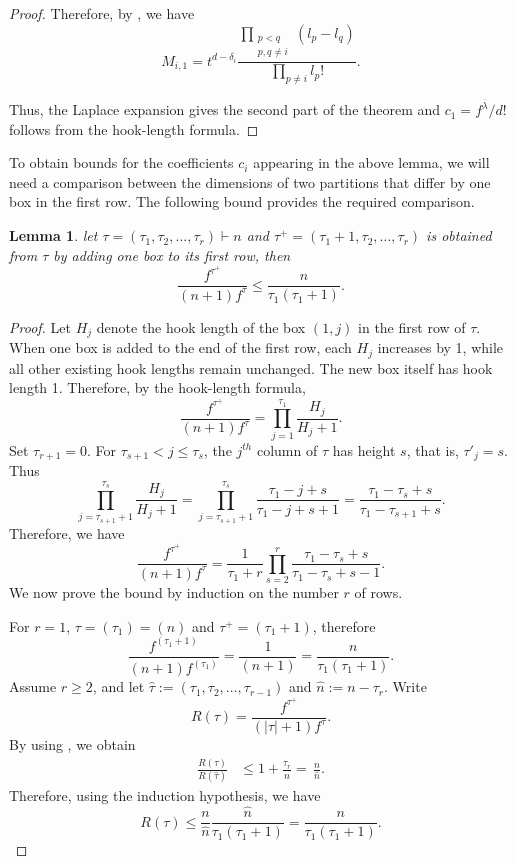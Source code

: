 \documentclass[12pt]{article}
\newtheorem{lemma}{Lemma}[section]
\theoremstyle{definition}
\newcommand{\1}{\mathbf 1}
\begin{document}
\begin{proof}
Therefore, by , we have 
$$M_{i,1}=t^{d-\delta_i}\frac{\prod_{\substack{p<q\\p,q\neq i}}(l_p-l_q)}{\prod_{p\neq i}l_p!}.$$

Thus, the Laplace expansion gives the second part of the theorem and $c_1=f^{\overline{\lambda}}/d!$ follows from the hook-length formula.
\end{proof}

To obtain bounds for the coefficients $c_i$ appearing in the above lemma, we will need a comparison between the dimensions of two partitions that differ by one box in the first row. The following bound provides the required comparison.

\begin{lemma}\label{lem:fTtau_bound_adding_one_box}
    let $\tau=(\tau_1,\tau_2,\ldots, \tau_r)\vdash n$ and $\tau^+=(\tau_1+1,\tau_2,\ldots, \tau_r)$ is obtained from $\tau$ by adding one box to its first row, then 
    $$\frac{f^{\tau^+}}{(n+1)f^{\tau}}\leq \frac{n}{\tau_1(\tau_1+1)}.$$
\end{lemma}
\begin{proof}
    Let $H_j$ denote the hook length of the box $(1,j)$ in the first row of $\tau$. When one box is added to the end of the first row, each $H_j$ increases by 1, while all other existing hook lengths remain unchanged. The new box itself has hook length 1. Therefore, by the hook-length formula,
    $$\frac{f^{\tau^+}}{(n+1)f^{\tau}} =  \prod_{j=1}^{\tau_1}\frac{H_j}{H_j+1}.$$
Set $\tau_{r+1}=0$. For $\tau_{s+1}<j\leq \tau_s$, the $j^{th}$ column of $\tau$ has height $s$, that is, $\tau'_j=s$. Thus
$$\prod_{j=\tau_{s+1}+1}^{\tau_s}\frac{H_j}{H_j+1}=\prod_{j=\tau_{s+1}+1}^{\tau_s}\frac{\tau_1-j+s}{\tau_1-j+s+1}=\frac{\tau_1-\tau_s+s}{\tau_1-\tau_{s+1}+s}.$$
Therefore, we have 
\begin{equation}\label{eqn:RHS_EXPRS}
    \frac{f^{\tau^+}}{(n+1)f^{\tau}} =\frac{1}{\tau_1+r}\prod_{s=2}^{r}\frac{\tau_1-\tau_s+s}{\tau_1-\tau_{s}+s-1}.
\end{equation}
We now prove the bound by induction on the number $r$ of rows. 

For $r=1$, $\tau=(\tau_1)=(n)$ and $\tau^+=(\tau_1+1)$, therefore
$$\frac{f^{(\tau_1+1)}}{(n+1)f^{(\tau_1)}}=\frac{1}{(n+1)}=\frac{n}{\tau_1(\tau_1+1)}.$$
Assume $r\geq 2$, and let $\hat{\tau}:=(\tau_1,\tau_2,\ldots, \tau_{r-1})$ and $\hat{n}:=n-\tau_r$. 
Write $$R(\tau)=\frac{f^{\tau^+}}{(|\tau|+1)f^{\tau}}.$$
By using , we obtain
\begin{align*}
  \frac{R(\tau)}{R(\hat{\tau})}
  &\leq 1+\frac{\tau_r}{\hat{n}}=\,\frac{n}{\hat{n}}.
\end{align*}
Therefore, using the induction hypothesis, we have 
$$R({\tau})\leq \frac{n}{\hat{n}}\frac{\hat{n}}{\tau_1(\tau_1+1)}=\frac{{n}}{\tau_1(\tau_1+1)}.$$
\end{proof}
\end{document}
